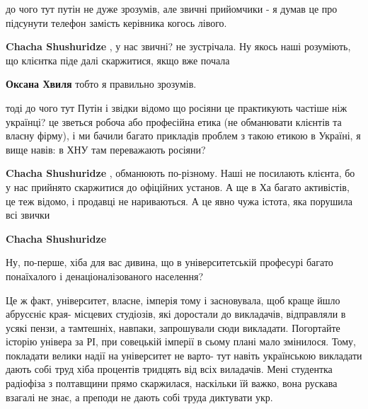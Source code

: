 \begin{itemize}
\begin{itemize}
до чого тут путін не дуже зрозумів, але звичні прийомчики - я думав це про підсунути телефон замість керівника когось лівого.

 
\textbf{Chacha Shushuridze} , у нас звичні? не зустрічала. Ну якось наші розуміють, що клієнтка піде далі скаржитися, якщо вже почала

 
\textbf{Оксана Хвиля} тобто я правильно зрозумів.

тоді до чого тут Путін і звідки відомо що росіяни це практикують частіше ніж
українці? це зветься робоча або професійна етика (не обманювати клієнтів та
власну фірму), і ми бачили багато прикладів проблем з такою етикою в Україні, я
вище навів: в ХНУ там переважають росіяни?


 
\textbf{Chacha Shushuridze} , обманюють по-різному. Наші не посилають клієнта,
бо у нас прийнято скаржитися до офіційних установ. А ще в Ха багато активістів,
це теж відомо, і продавці не нариваються. А це явно чужа істота, яка порушила
всі звички

 
\textbf{Chacha Shushuridze} 

Ну, по-перше, хіба для вас дивина, що в університетській професурі багато
понаїхалого і денаціоналізованого населення?

Це ж факт, університет, власне, імперія тому і засновувала, щоб краще йшло
абрусєніє края- місцевих студіозів, які доростали до викладачів, відправляли в
усякі пензи, а тамтешніх, навпаки, запрошували сюди викладати. Погортайте
історію універа за РІ, при совецькій імперії в сьому плані мало змінилося.
Тому, покладати велики надії на університет не варто- тут навіть українською
викладати дають собі труд хіба процентів тридцять від всіх виладачів. Мені
студентка радіофіза з полтавщини прямо скаржилася, наскільки їй важко, вона
рускава взагалі не знає, а преподи не дають собі труда диктувати укр.


\end{itemize}
\end{itemize}
